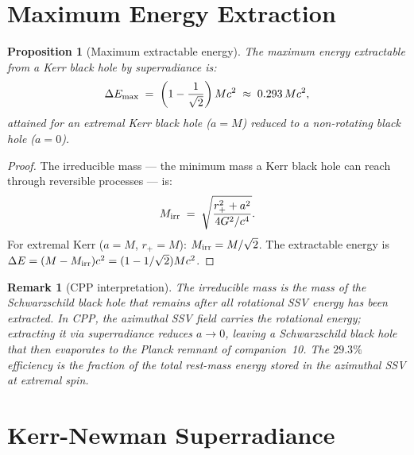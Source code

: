 \documentclass[12pt]{article}
\newtheorem{proposition}[theorem]{Proposition}
\newtheorem{remark}[theorem]{Remark}
\newcommand{\rplus}{r_+}
\begin{document}
\section{Maximum Energy Extraction}
\label{sec:max_energy}

\begin{proposition}[Maximum extractable energy]
\label{prop:max_energy}
The maximum energy extractable from a Kerr black hole by superradiance
is:
\begin{equation}
  \Delta E_{\rm max} \;=\; \left(1 - \frac{1}{\sqrt{2}}\right)Mc^2
  \;\approx\; 0.293\,Mc^2,
  \label{eq:max_energy}
\end{equation}
attained for an extremal Kerr black hole ($a = M$) reduced to a
non-rotating black hole ($a = 0$).
\end{proposition}

\begin{proof}
The irreducible mass — the minimum mass a Kerr black hole can reach
through reversible processes — is:
\begin{equation}
  M_{\rm irr} \;=\; \sqrt{\frac{r_+^2 + a^2}{4G^2/c^4}}.
  \label{eq:mirr}
\end{equation}
For extremal Kerr ($a = M$, $\rplus = M$):
$M_{\rm irr} = M/\sqrt{2}$.  The extractable energy is
$\Delta E = (M - M_{\rm irr})c^2 = (1-1/\sqrt{2})Mc^2$.
\end{proof}

\begin{remark}[CPP interpretation]
The irreducible mass is the mass of the Schwarzschild black hole that
remains after all rotational SSV energy has been extracted.  In CPP,
the azimuthal SSV field carries the rotational energy; extracting it
via superradiance reduces $a \to 0$, leaving a Schwarzschild black
hole that then evaporates to the Planck remnant of companion~10.
The $29.3\%$ efficiency is the fraction of the total rest-mass energy
stored in the azimuthal SSV at extremal spin.
\end{remark}

\section{Kerr-Newman Superradiance}
\label{sec:kn}
\end{document}
